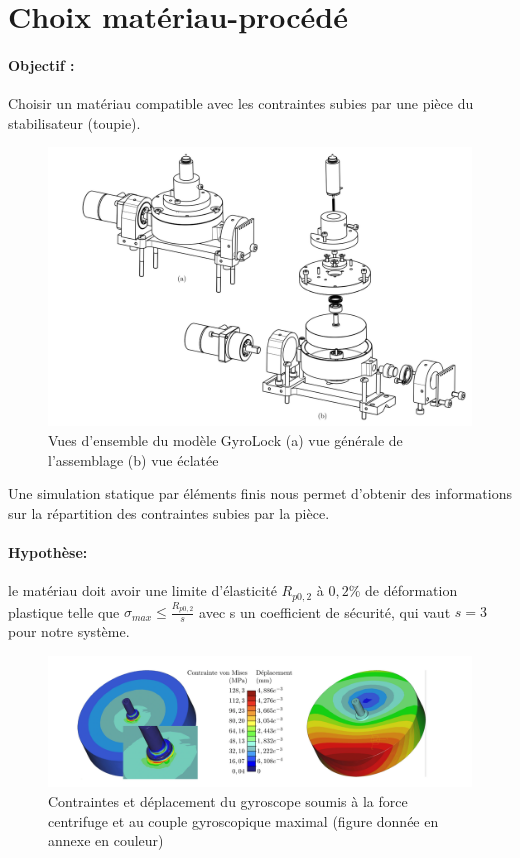 \section{Choix matériau-procédé}

\paragraph{Objectif :} Choisir un matériau compatible avec les contraintes subies par une pièce du stabilisateur (toupie).

\begin{figure}[ht]
\begin{center}
\includegraphics[width=0.6\linewidth]{img/fig19}
\caption{Vues d’ensemble du modèle GyroLock (a) vue générale de l’assemblage (b) vue éclatée}
\label{fig19}
\end{center}
\end{figure}

Une simulation statique par éléments finis nous permet d’obtenir des informations sur la répartition des contraintes subies par la pièce.

\paragraph{Hypothèse:} le matériau doit avoir une limite d’élasticité $ R_{p0,2}$ à $0,2\%$ de déformation plastique telle que $\sigma_{max}\leq \frac{ R_{p0,2}}{s}$ avec s un coefficient de sécurité, qui vaut $s=3$ pour notre système.

\begin{figure}[ht]
\begin{center}
\includegraphics[width=0.6\linewidth]{img/fig20}
\caption{Contraintes et déplacement du gyroscope soumis à la force centrifuge et au couple gyroscopique maximal (figure donnée en annexe en couleur)}
\label{fig20}
\end{center}
\end{figure}

